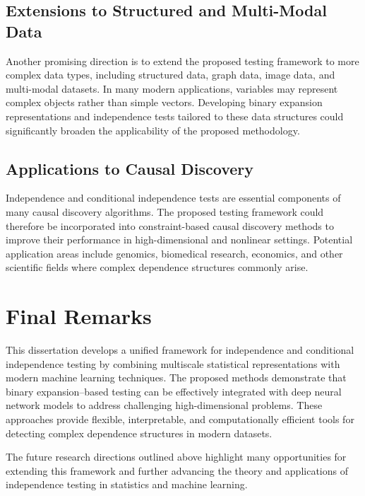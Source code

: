 \documentclass[12pt,reqno,oneside]{amsbook}
\theoremstyle{definition}
\theoremstyle{remark}
\begin{document}
\subsection{Extensions to Structured and Multi-Modal Data}

Another promising direction is to extend the proposed testing framework to more complex data types, including structured data, graph data, image data, and multi-modal datasets. In many modern applications, variables may represent complex objects rather than simple vectors. Developing binary expansion representations and independence tests tailored to these data structures could significantly broaden the applicability of the proposed methodology.

\subsection{Applications to Causal Discovery}

Independence and conditional independence tests are essential components of many causal discovery algorithms. The proposed testing framework could therefore be incorporated into constraint-based causal discovery methods to improve their performance in high-dimensional and nonlinear settings. Potential application areas include genomics, biomedical research, economics, and other scientific fields where complex dependence structures commonly arise.

\section{Final Remarks}

This dissertation develops a unified framework for independence and conditional independence testing by combining multiscale statistical representations with modern machine learning techniques. The proposed methods demonstrate that binary expansion–based testing can be effectively integrated with deep neural network models to address challenging high-dimensional problems. These approaches provide flexible, interpretable, and computationally efficient tools for detecting complex dependence structures in modern datasets.

The future research directions outlined above highlight many opportunities for extending this framework and further advancing the theory and applications of independence testing in statistics and machine learning.
\backmatter
\singlespacing



\end{document}
